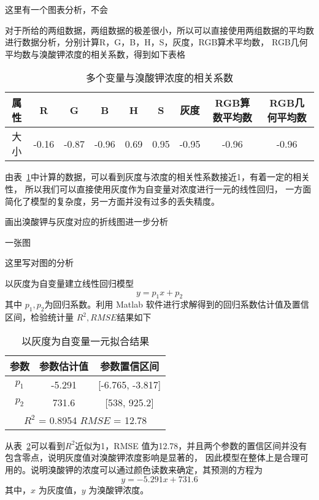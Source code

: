     这里有一个图表分析，不会

    对于所给的两组数据，两组数据的极差很小，所以可以直接使用两组数据的平均数进行数据分析，分别计算R，G，B，H，S，灰度，RGB算术平均数，
    RGB几何平均数与溴酸钾浓度的相关系数，得到如下表格

    \begin{table}[H]
        \centering
        \caption{多个变量与溴酸钾浓度的相关系数}
        \label{多变量与溴酸钾浓度}
        \begin{tabular}{@{}ccccccccc@{}}
        \toprule
        属性 & R     & G     & B     & H    & S    & 灰度    & RGB算数平均数 & RGB几何平均数 \\ \midrule
        大小 & -0.16 & -0.87 & -0.96 & 0.69 & 0.95 & -0.95 & -0.96    & -0.96    \\ \bottomrule
        \end{tabular}
        \end{table}


    由表~\ref{多变量与溴酸钾浓度}中计算的数据，可以看到灰度与浓度的相关性系数接近1，有着一定的相关性，
    所以我们可以直接使用灰度作为自变量对浓度进行一元的线性回归， 一方面简化了模型的复杂度，另一方面并没有过多的丢失精度。
    
    画出溴酸钾与灰度对应的折线图进一步分析

    一张图

    这里写对图的分析

    以灰度为自变量建立线性回归模型
    $$ y = p_1 x + p_2$$
    其中 $p_{1},p_{2}$为回归系数。利用 Matlab 软件进行求解得到的回归系数估计值及置信区间，检验统计量 $R^2, RMSE $结果如下

    \begin{table}[H]
        \centering
        \caption{以灰度为自变量一元拟合结果}
        \label{溴酸钾一元拟合}
        \begin{tabular}{@{}ccc@{}}
        \toprule
        参数        & 参数估计值      & 参数置信区间                   \\ \midrule
        $p_1$     & -5.291     & {[}-6.765, -3.817{]}     \\
        $p_2$     & 731.6      & {[}538, 925.2{]}         \\
        \hline
        \multicolumn{3}{c}{$R^2$ = 0.8954 $RMSE$ = 12.78} \\ \bottomrule
        \end{tabular}
        \end{table}
    从表~\ref{溴酸钾一元拟合}可以看到$R^2$近似为1，RMSE 值为12.78，并且两个参数的置信区间并没有包含零点，说明灰度值对溴酸钾浓度影响是显著的，
    因此模型在整体上是合理可用的。说明溴酸钾的浓度可以通过颜色读数来确定，其预测的方程为
    $$ y = -5.291 x + 731.6 $$ 
    其中，$x$ 为灰度值，$y$ 为溴酸钾浓度。

